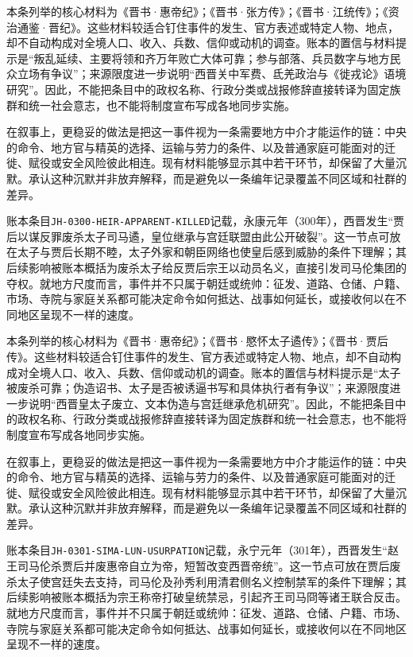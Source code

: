 本条列举的核心材料为《晋书·惠帝纪》；《晋书·张方传》；《晋书·江统传》；《资治通鉴·晋纪》。这些材料较适合钉住事件的发生、官方表述或特定人物、地点，却不自动构成对全境人口、收入、兵数、信仰或动机的调查。账本的置信与材料提示是“叛乱延续、主要将领和齐万年败亡大体可靠；参与部落、兵员数字与地方民众立场有争议”；来源限度进一步说明“西晋关中军费、氐羌政治与《徙戎论》语境研究”。因此，不能把条目中的政权名称、行政分类或战报修辞直接转译为固定族群和统一社会意志，也不能将制度宣布写成各地同步实施。

在叙事上，更稳妥的做法是把这一事件视为一条需要地方中介才能运作的链：中央的命令、地方官与精英的选择、运输与劳力的条件、以及普通家庭可能面对的迁徙、赋役或安全风险彼此相连。现有材料能够显示其中若干环节，却保留了大量沉默。承认这种沉默并非放弃解释，而是避免以一条编年记录覆盖不同区域和社群的差异。

账本条目\texttt{JH-0300-HEIR-APPARENT-KILLED}记载，永康元年（300年），西晋发生“贾后以谋反罪废杀太子司马遹，皇位继承与宫廷联盟由此公开破裂”。这一节点可放在太子与贾后长期不睦，太子外家和朝臣网络也使皇后感到威胁的条件下理解；其后续影响被账本概括为废杀太子给反贾后宗王以动员名义，直接引发司马伦集团的夺权。就地方尺度而言，事件并不只属于朝廷或统帅：征发、道路、仓储、户籍、市场、寺院与家庭关系都可能决定命令如何抵达、战事如何延长，或接收何以在不同地区呈现不一样的速度。

本条列举的核心材料为《晋书·惠帝纪》；《晋书·愍怀太子遹传》；《晋书·贾后传》。这些材料较适合钉住事件的发生、官方表述或特定人物、地点，却不自动构成对全境人口、收入、兵数、信仰或动机的调查。账本的置信与材料提示是“太子被废杀可靠；伪造诏书、太子是否被诱逼书写和具体执行者有争议”；来源限度进一步说明“西晋皇太子废立、文本伪造与宫廷继承危机研究”。因此，不能把条目中的政权名称、行政分类或战报修辞直接转译为固定族群和统一社会意志，也不能将制度宣布写成各地同步实施。

在叙事上，更稳妥的做法是把这一事件视为一条需要地方中介才能运作的链：中央的命令、地方官与精英的选择、运输与劳力的条件、以及普通家庭可能面对的迁徙、赋役或安全风险彼此相连。现有材料能够显示其中若干环节，却保留了大量沉默。承认这种沉默并非放弃解释，而是避免以一条编年记录覆盖不同区域和社群的差异。

账本条目\texttt{JH-0301-SIMA-LUN-USURPATION}记载，永宁元年（301年），西晋发生“赵王司马伦杀贾后并废惠帝自立为帝，短暂改变西晋帝统”。这一节点可放在贾后废杀太子使宫廷失去支持，司马伦及孙秀利用清君侧名义控制禁军的条件下理解；其后续影响被账本概括为宗王称帝打破皇统禁忌，引起齐王司马冏等诸王联合反击。就地方尺度而言，事件并不只属于朝廷或统帅：征发、道路、仓储、户籍、市场、寺院与家庭关系都可能决定命令如何抵达、战事如何延长，或接收何以在不同地区呈现不一样的速度。

